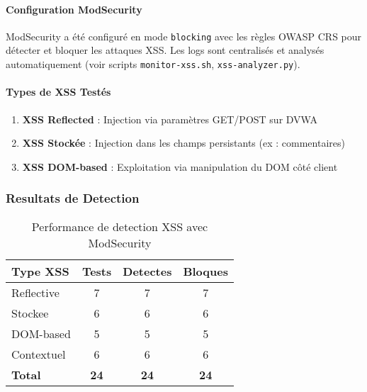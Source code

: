 \paragraph{Configuration ModSecurity}
ModSecurity a été configuré en mode \texttt{blocking} avec les règles OWASP CRS pour détecter et bloquer les attaques XSS. Les logs sont centralisés et analysés automatiquement (voir scripts \texttt{monitor-xss.sh}, \texttt{xss-analyzer.py}).

\paragraph{Types de XSS Testés}
\begin{enumerate}
    \item \textbf{XSS Reflected} : Injection via paramètres GET/POST sur DVWA
    \item \textbf{XSS Stockée} : Injection dans les champs persistants (ex : commentaires)
    \item \textbf{XSS DOM-based} : Exploitation via manipulation du DOM côté client
\end{enumerate}

\subsubsection{Resultats de Detection}

\begin{table}[H]
    \centering
    \caption{Performance de detection XSS avec ModSecurity}
    \begin{tabular}{|l|c|c|c|}
        \hline
        \textbf{Type XSS} & \textbf{Tests} & \textbf{Detectes} & \textbf{Bloques} \\
        \hline
        Reflective        & 7              & 7                 & 7                \\
        \hline
        Stockee           & 6              & 6                 & 6                \\
        \hline
        DOM-based         & 5              & 5                 & 5                \\
        \hline
        Contextuel        & 6              & 6                 & 6                \\
        \hline
        \textbf{Total}    & \textbf{24}    & \textbf{24}       & \textbf{24}      \\
        \hline
    \end{tabular}
\end{table}

